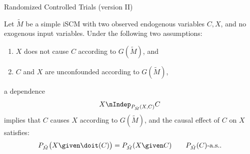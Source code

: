 \begin{frame}{Randomized Controlled Trials (version II)}
\begin{Prp}[\ref{prp:RCT3}]
Let $\tilde{M}$ be a simple iSCM with two observed endogenous variables $C, X$, and no exogenous input variables.
Under the following two assumptions:
  \begin{enumerate}
    \item $X$ does not cause $C$ according to $G(\tilde{M})$, and
    \item $C$ and $X$ are unconfounded according to $G(\tilde{M})$,
  \end{enumerate}
a dependence 
  $$X \nIndep_{P_{\tilde{M}}(X,C)} C$$
  implies that $C$ causes $X$ according to $G(\tilde{M})$, and the causal effect of $C$ on $X$ satisfies:
  \begin{equation}\label{sl-eq:RCT_causal_effect3}
    P_{\tilde{M}}\big(X \given \doit(C)\big) = P_{\tilde{M}}(X \given C) \qquad P_{\tilde{M}}(C)\text{-a.s.}.
  \end{equation}
\end{Prp}
\end{frame}

